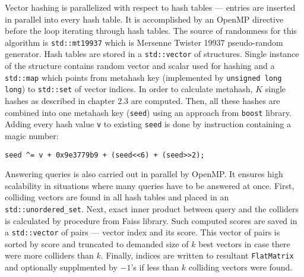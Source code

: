 Vector hashing is parallelized with respect to hash tables --- entries are inserted in parallel
into every hash table. It is accomplished by an OpenMP directive before the loop iterating through
hash tables.
The source of randomness for this algorithm is \texttt{std::mt19937} which is Mersenne
Twister 19937 pseudo-random generator.
Hash tables are stored in a \texttt{std::vector} of structures. Single instance of the structure
contains random vector and scalar used for hashing and a \texttt{std::map} which points from
metahash key (implemented by \texttt{unsigned long long}) to \texttt{std::set} of vector indices.
In order to calculate metahash, $K$ single hashes as described in chapter 2.3 are computed.
Then, all these hashes are combined into one metahash key (\texttt{seed}) using an approach from
\texttt{boost} library. Adding every hash value \texttt{v} to existing \texttt{seed} is done
by instruction containing a magic number:
\begin{verbatim}
seed ^= v + 0x9e3779b9 + (seed<<6) + (seed>>2);
\end{verbatim}

Answering queries is also carried out in parallel by OpenMP. It ensures high scalability in situations
where many queries have to be answered at once. First, colliding vectors are found in all hash
tables and placed in an \texttt{std::unordered\_set}. Next, exact inner product between query and
the colliders is calculated by  procedure from Faiss library.
Such computed scores are saved in a \texttt{std::vector} of pairs --- vector index and its score.
This vector of pairs is sorted by score and truncated to demanded size of $k$ best vectors in case
there were more colliders than $k$. Finally, indices are written to resultant \texttt{FlatMatrix}
and optionally supplmented by $-1$'s if less than $k$ colliding vectors were found.
